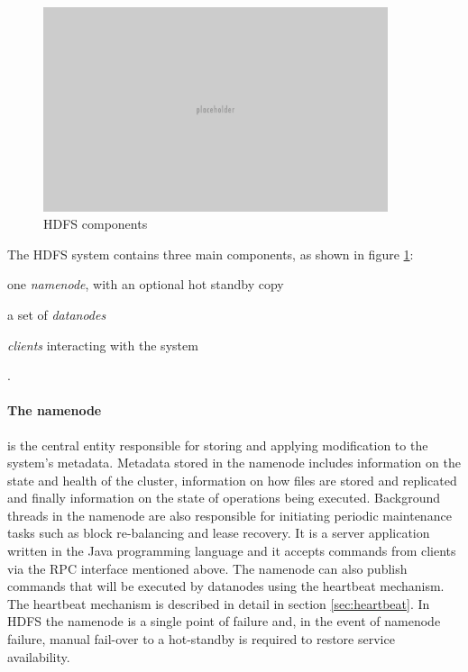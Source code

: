 \begin{figure}[h]
\caption{HDFS components}
\label{fig:hdfs-block-diagram}
\centering
\includegraphics[width=0.9\textwidth]{images/placeholder.png}
\end{figure}

The HDFS system contains three main components, as shown in figure \ref{fig:hdfs-block-diagram}:
\begin{inparaenum}[1)]
\item one \emph{namenode}, with an optional hot standby copy
\item a set of \emph{datanodes}
\item \emph{clients} interacting with the system
\end{inparaenum}.

\paragraph{The namenode} is the central entity responsible for storing and applying modification to the system's metadata.
Metadata stored in the namenode includes information on the state and health of the cluster, information on how files are stored and replicated and finally information on the state of operations being executed.
Background threads in the namenode are also responsible for initiating periodic maintenance tasks such as block re-balancing and lease recovery.
It is a server application written in the Java programming language and it accepts commands from clients via the RPC interface mentioned above.
The namenode can also publish commands that will be executed by datanodes using the heartbeat mechanism.
The heartbeat mechanism is described in detail in section \ref{sec:heartbeat}.
In HDFS the namenode is a single point of failure and, in the event of namenode failure, manual fail-over to a hot-standby is required to restore service availability.

